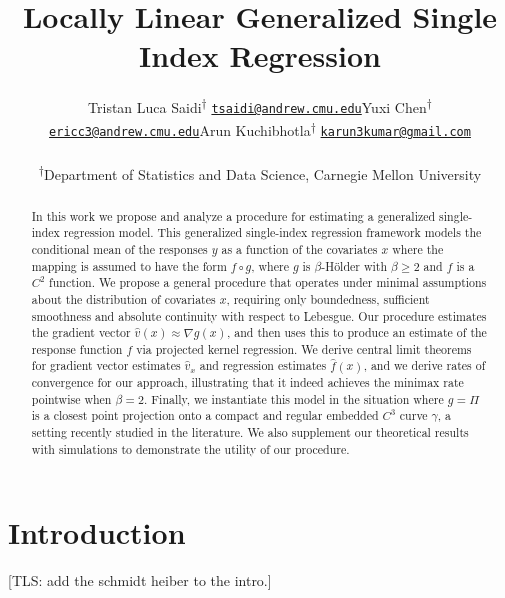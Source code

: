 \documentclass[11pt]{article}
\title{Locally Linear Generalized Single Index Regression}
\author{
\begin{tabular}{c c c}
\makecell[c]{Tristan Luca Saidi\textsuperscript{\(\dagger\)}\\
\href{mailto:tsaidi@andrew.cmu.edu}{\nolinkurl{tsaidi@andrew.cmu.edu}}}
&
\makecell[c]{Yuxi Chen\textsuperscript{\(\dagger\)}\\
\href{mailto:ericc3@andrew.cmu.edu}{\nolinkurl{ericc3@andrew.cmu.edu}}}
&
\makecell[c]{Arun Kuchibhotla\textsuperscript{\(\dagger\)}\\
\href{mailto:karun3kumar@gmail.com}
{\nolinkurl{karun3kumar@gmail.com}}}
\end{tabular}\\[0.75em]
\textsuperscript{\(\dagger\)}Department of Statistics and Data Science, Carnegie Mellon University
}
\newcommand{\tls}[1]{{\color{cyan}[TLS: #1]}}
\begin{document}

\maketitle

\begin{abstract}
    In this work we propose and analyze a procedure for estimating a generalized single-index regression model. This generalized single-index regression framework models the conditional mean of the responses $y$ as a function of the covariates $x$ where the mapping is assumed to have the form $f \circ g$, where $g$ is $\beta$-H\"older with $\beta \geq 2$ and $f$ is a $C^2$ function. We propose a general procedure that operates under minimal assumptions about the distribution of covariates $x$, requiring only boundedness, sufficient smoothness and absolute continuity with respect to Lebesgue. Our procedure estimates the gradient vector $\hat v(x) \approx \nabla g(x)$, and then uses this to produce an estimate of the response function $f$ via projected kernel regression. We derive central limit theorems for gradient vector estimates $\hat{v}_x$ and regression estimates $\hat{f}(x)$, and we derive rates of convergence for our approach, illustrating that it indeed achieves the minimax rate pointwise when $\beta = 2$.  Finally, we instantiate this model in the situation where $g = \Pi$ is a closest point projection onto a compact and regular embedded $C^3$ curve $\gamma$, a setting recently studied in the literature. We also supplement our theoretical results with simulations to demonstrate the utility of our procedure.   
\end{abstract}

\tableofcontents

\section{Introduction}

\tls{add the schmidt heiber to the intro.}
\end{document}
